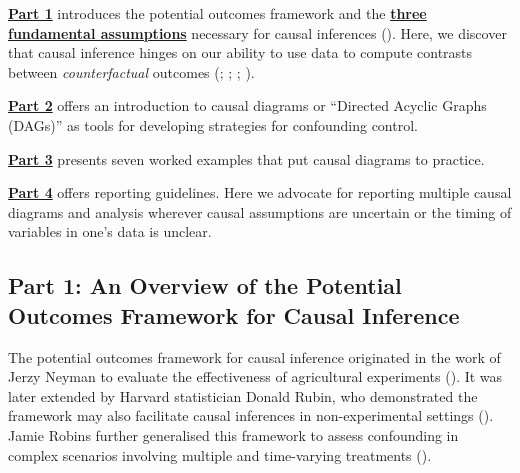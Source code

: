\documentclass[
  singlecolumn]{article}
\begin{document}
\hyperref[section-part1]{\textbf{Part 1}} introduces the potential
outcomes framework and the
\hyperref[sec-three-fundamental-assumptions]{\textbf{three fundamental
assumptions}} necessary for causal inferences
(). Here, we discover
that causal inference hinges on our ability to use data to compute
contrasts between \emph{counterfactual} outcomes
(;
;
;
).

\hyperref[section-part2]{\textbf{Part 2}} offers an introduction to
causal diagrams or ``Directed Acyclic Graphs (DAGs)'' as tools for
developing strategies for confounding control.

\hyperref[section-part3]{\textbf{Part 3}} presents seven worked examples
that put causal diagrams to practice.

\hyperref[section-part4]{\textbf{Part 4}} offers reporting guidelines.
Here we advocate for reporting multiple causal diagrams and analysis
wherever causal assumptions are uncertain or the timing of variables in
one's data is unclear.

\subsection{Part 1: An Overview of the Potential Outcomes Framework for
Causal Inference}\label{section-part1}

The potential outcomes framework for causal inference originated in the
work of Jerzy Neyman to evaluate the effectiveness of agricultural
experiments (). It was later
extended by Harvard statistician Donald Rubin, who demonstrated the
framework may also facilitate causal inferences in non-experimental
settings (). Jamie Robins further
generalised this framework to assess confounding in complex scenarios
involving multiple and time-varying treatments
().
\end{document}
